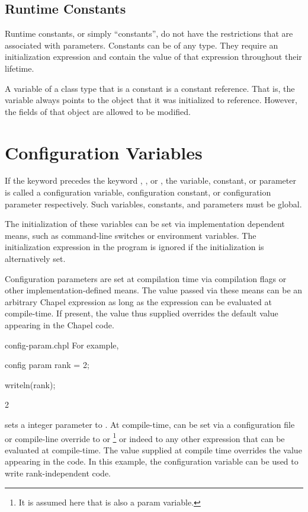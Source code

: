 \subsection{Runtime Constants}
\label{Runtime_Constants}

Runtime constants, or simply ``constants'',
do not have the restrictions that are associated with
parameters.  Constants can be of any type.  They require an initialization
expression and contain the value of that expression throughout their lifetime.

A variable of a class type that is a constant is a constant reference.
That is, the variable always
points to the object that it was initialized to reference.
However, the fields of that object are allowed to be modified.

\section{Configuration Variables}
\label{Configuration_Variables}

If the keyword  precedes the
keyword , , or , the variable,
constant, or parameter is called a configuration variable,
configuration constant, or configuration parameter respectively.  Such
variables, constants, and parameters must be global.

The initialization of these variables can be set via implementation
dependent means, such as command-line switches or environment
variables.  The initialization expression in the program is ignored if
the initialization is alternatively set.

Configuration parameters are set at compilation time via compilation
flags or other implementation-defined means.  The value passed via
these means can be an arbitrary Chapel expression as long as the
expression can be evaluated at compile-time.  If present, the value thus
supplied overrides the default value appearing in the Chapel code.

\begin{chapelexample}{config-param.chpl}
For example,
\begin{chapel}
config param rank = 2;
\end{chapel}
\begin{chapelnoprint}
writeln(rank);
\end{chapelnoprint}
\begin{chapeloutput}
2
\end{chapeloutput}
sets a integer parameter  to .  At
compile-time,  can be set via a configuration file or compile-line
override to  or \footnote{It is assumed here that  is
also a param variable.} or indeed to any other expression
that can be evaluated at compile-time.  The value supplied at compile time
overrides the value  appearing in the code.  In this example, the 
configuration variable can be used to write rank-independent code.
\end{chapelexample}
